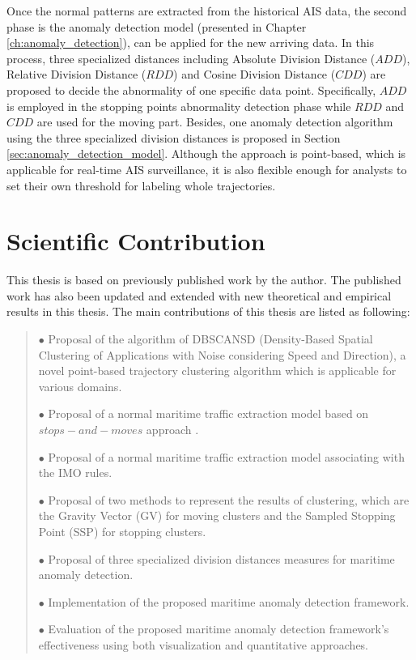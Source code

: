 \documentclass[12pt,glossary]{dalcsthesis}
\begin{document}
Once the normal patterns are extracted from the historical AIS data, the second phase is the anomaly detection model (presented in Chapter \ref{ch:anomaly_detection}), can be applied for the new arriving data. In this process, three specialized distances including Absolute Division Distance ($ADD$), Relative Division Distance ($RDD$) and Cosine Division Distance ($CDD$) are proposed to decide the abnormality of one specific data point. Specifically, $ADD$ is employed in the stopping points abnormality detection phase while $RDD$ and $CDD$ are used for the moving part. Besides, one anomaly detection algorithm using the three specialized division distances is proposed in Section \ref{sec:anomaly_detection_model}. Although the approach is point-based, which is applicable for real-time AIS surveillance, it is also flexible enough for analysts to set their own threshold for labeling whole trajectories.


\section{Scientific Contribution}

This thesis is based on previously published work by the author. The published
work has also been updated and extended with new theoretical and empirical
results in this thesis. The main contributions of this thesis are listed as following:

\begin{quote}
$\bullet$ Proposal of the algorithm of DBSCANSD (Density-Based Spatial Clustering of Applications with Noise considering Speed and Direction), a novel point-based trajectory clustering algorithm which is applicable for various domains.


$\bullet$ Proposal of a normal maritime traffic extraction model based on $stops-and-moves$ approach \cite{stopmove}. 

$\bullet$ Proposal of a normal maritime traffic extraction model associating with the IMO rules. 

$\bullet$ Proposal of two methods to represent the results of clustering, which are the Gravity Vector (GV) for moving clusters and the Sampled Stopping Point (SSP) for stopping clusters.

$\bullet$ Proposal of three specialized division distances measures for maritime anomaly detection.

$\bullet$ Implementation of the proposed maritime anomaly detection framework.

$\bullet$ Evaluation of the proposed maritime anomaly detection framework's effectiveness using both visualization and quantitative approaches.

\end{quote}
\end{document}
